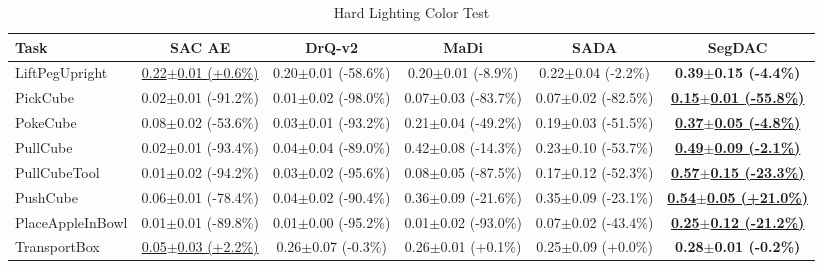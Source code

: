 \begin{table}[htbp]
\centering
\scriptsize
\caption{Hard Lighting Color Test}
\label{tab:appendix_lightingcolortest_hard}
\begin{adjustbox}{max width=\textwidth}
\begin{tabular}{l*{5}{c}}
\toprule
\textbf{Task} & \textbf{SAC AE} & \textbf{DrQ-v2} & \textbf{MaDi} & \textbf{SADA} & \textbf{SegDAC} \\
\midrule
LiftPegUpright & \underline{0.22$\pm$0.01 \scriptsize{(+0.6\%)}} & 0.20$\pm$0.01 \scriptsize{(-58.6\%)} & 0.20$\pm$0.01 \scriptsize{(-8.9\%)} & 0.22$\pm$0.04 \scriptsize{(-2.2\%)} & \textbf{0.39$\pm$0.15 \scriptsize{(-4.4\%)}} \\
PickCube & 0.02$\pm$0.01 \scriptsize{(-91.2\%)} & 0.01$\pm$0.02 \scriptsize{(-98.0\%)} & 0.07$\pm$0.03 \scriptsize{(-83.7\%)} & 0.07$\pm$0.02 \scriptsize{(-82.5\%)} & \textbf{\underline{0.15$\pm$0.01 \scriptsize{(-55.8\%)}}} \\
PokeCube & 0.08$\pm$0.02 \scriptsize{(-53.6\%)} & 0.03$\pm$0.01 \scriptsize{(-93.2\%)} & 0.21$\pm$0.04 \scriptsize{(-49.2\%)} & 0.19$\pm$0.03 \scriptsize{(-51.5\%)} & \textbf{\underline{0.37$\pm$0.05 \scriptsize{(-4.8\%)}}} \\
PullCube & 0.02$\pm$0.01 \scriptsize{(-93.4\%)} & 0.04$\pm$0.04 \scriptsize{(-89.0\%)} & 0.42$\pm$0.08 \scriptsize{(-14.3\%)} & 0.23$\pm$0.10 \scriptsize{(-53.7\%)} & \textbf{\underline{0.49$\pm$0.09 \scriptsize{(-2.1\%)}}} \\
PullCubeTool & 0.01$\pm$0.02 \scriptsize{(-94.2\%)} & 0.03$\pm$0.02 \scriptsize{(-95.6\%)} & 0.08$\pm$0.05 \scriptsize{(-87.5\%)} & 0.17$\pm$0.12 \scriptsize{(-52.3\%)} & \textbf{\underline{0.57$\pm$0.15 \scriptsize{(-23.3\%)}}} \\
PushCube & 0.06$\pm$0.01 \scriptsize{(-78.4\%)} & 0.04$\pm$0.02 \scriptsize{(-90.4\%)} & 0.36$\pm$0.09 \scriptsize{(-21.6\%)} & 0.35$\pm$0.09 \scriptsize{(-23.1\%)} & \textbf{\underline{0.54$\pm$0.05 \scriptsize{(+21.0\%)}}} \\
PlaceAppleInBowl & 0.01$\pm$0.01 \scriptsize{(-89.8\%)} & 0.01$\pm$0.00 \scriptsize{(-95.2\%)} & 0.01$\pm$0.02 \scriptsize{(-93.0\%)} & 0.07$\pm$0.02 \scriptsize{(-43.4\%)} & \textbf{\underline{0.25$\pm$0.12 \scriptsize{(-21.2\%)}}} \\
TransportBox & \underline{0.05$\pm$0.03 \scriptsize{(+2.2\%)}} & 0.26$\pm$0.07 \scriptsize{(-0.3\%)} & 0.26$\pm$0.01 \scriptsize{(+0.1\%)} & 0.25$\pm$0.09 \scriptsize{(+0.0\%)} & \textbf{0.28$\pm$0.01 \scriptsize{(-0.2\%)}} \\
\bottomrule
\end{tabular}
\end{adjustbox}
\end{table}


